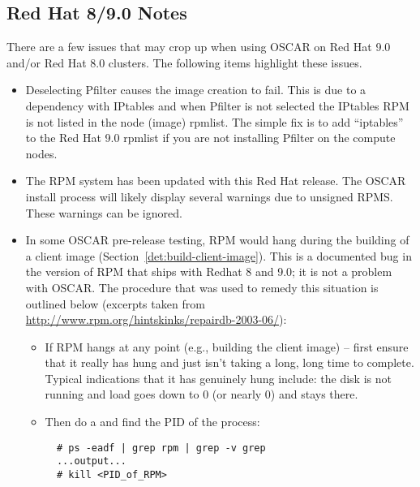 \subsection{Red Hat 8/9.0 Notes}
\label{subsec:rh90notes}

There are a few issues that may crop up when using OSCAR on Red Hat 9.0
and/or Red Hat 8.0 clusters.  The following items highlight these
issues.  

\begin{itemize}

\item Deselecting Pfilter causes the image creation to fail.  This is
  due to a dependency with IPtables and when Pfilter is not selected
  the IPtables RPM is not listed in the node (image) rpmlist.   The simple
  fix is to add ``iptables'' to the Red Hat 9.0 rpmlist if you are not
  installing Pfilter on the compute nodes.

\item The RPM system has been updated with this Red Hat release.  The
 OSCAR install process will likely display several warnings due to unsigned
 RPMS.  These warnings can be ignored. 

\item In some OSCAR pre-release testing, RPM would hang during the
  building of a client image (Section~\ref{det:build-client-image}).
  This is a documented bug in the version of RPM that ships with
  Redhat 8 and 9.0; it is not a problem with OSCAR.  The procedure
  that was used to remedy this situation is outlined below (excerpts
  taken from \url{http://www.rpm.org/hintskinks/repairdb-2003-06/}):
        \begin{itemize}
        \item If RPM hangs at any point (e.g., building the client
          image) -- first ensure that it really has hung and just
          isn't taking a long, long time to complete.  Typical
          indications that it has genuinely hung include: the disk is
          not running and load goes down to 0 (or nearly 0) and stays
          there.
          
        \item Then do a  and find the PID of the 
          process:
\begin{verbatim}
  # ps -eadf | grep rpm | grep -v grep
  ...output...
  # kill <PID_of_RPM>
\end{verbatim}
          

\end{itemize}
\end{itemize}
